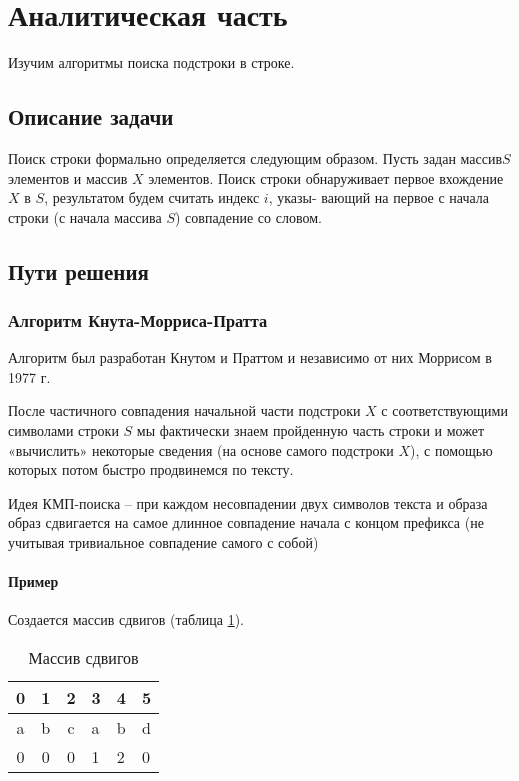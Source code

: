 \newpage
\section{Аналитическая часть}

Изучим алгоритмы поиска подстроки в строке.

\subsection{Описание задачи}

Поиск строки формально определяется следующим образом. Пусть задан массив$S$ элементов и массив $X$ элементов. Поиск строки обнаруживает первое вхождение $X$ в $S$, результатом будем считать индекс $i$, указы- вающий на первое с начала строки (с начала массива $S$) совпадение со словом.

\subsection{Пути решения}

\subsubsection{Алгоритм Кнута-Морриса-Пратта}

Алгоритм был разработан Кнутом и Праттом и независимо от них
Моррисом в 1977 г.

После частичного совпадения начальной части подстроки $X$ с
соответствующими символами строки $S$ мы фактически знаем
пройденную часть строки и может «вычислить» некоторые сведения
(на основе самого подстроки $X$), с помощью которых потом быстро
продвинемся по тексту.

Идея КМП-поиска -- при каждом несовпадении двух символов текста и
образа образ сдвигается на самое длинное совпадение начала с концом
префикса (не учитывая тривиальное совпадение самого с собой)

\paragraph{Пример}

Создается массив сдвигов (таблица \ref{table:example1}).

\begin{table}[H]
    \centering
    \caption{Массив сдвигов}
    \label{table:example1}
    \begin{tabular}{|c|c|c|l|l|l|}
    \hline
    0 & 1 & 2 & 3 & 4 & 5 \\ \hline
    a & b & c & a & b & d \\ \hline
    0 & 0 & 0 & 1 & 2 & 0 \\ \hline
    \end{tabular}
\end{table}

